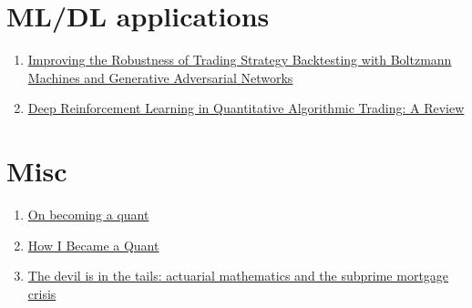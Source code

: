 \documentclass[a4paper, 12pt]{article}
\begin{document}
\section*{ML/DL applications}
\begin{enumerate}
\item \href{http://thierry-roncalli.com/download/rbm_gan_backtesting.pdf}{Improving the Robustness of Trading Strategy Backtesting with Boltzmann Machines and Generative Adversarial Networks}

\item \href{https://arxiv.org/pdf/2106.00123.pdf}{Deep Reinforcement Learning in Quantitative Algorithmic Trading: A Review}
\end{enumerate}

\section*{Misc}
\begin{enumerate}
	
	\item \href{https://www.maths.usyd.edu.au/u/UG/SM/MATH3075/r/Joshi_2008.pdf}{On becoming a quant}
	\item \href{https://engineering.nyu.edu/sites/default/files/2021-10/How_I_Became_a_Quant\%20\%281\%29.pdf}{How I Became a Quant}
	
	\item \href{http://www.macs.hw.ac.uk/~cd134/2010/donemb.pdf}{The devil is in the tails: actuarial mathematics and the subprime mortgage crisis}
\end{enumerate}
\end{document}
